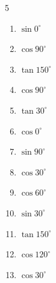 \begin{multicols}{5}
\begin{enumerate}
  \item $\displaystyle \sin{0^\circ}$

        \phantom{$\displaystyle =0$}

  \item $\displaystyle \cos{90^\circ}$

        \phantom{$\displaystyle =0$}

  \item $\displaystyle \tan{150^\circ}$


  \item $\displaystyle \cos{90^\circ}$

        \phantom{$\displaystyle =0$}

  \item $\displaystyle \tan{30^\circ}$


  \item $\displaystyle \cos{0^\circ}$

        \phantom{$\displaystyle =1$}

  \item $\displaystyle \sin{90^\circ}$

        \phantom{$\displaystyle =1$}

  \item $\displaystyle \cos{30^\circ}$


  \item $\displaystyle \cos{60^\circ}$


\columnbreak %

  \item $\displaystyle \sin{30^\circ}$


  \item $\displaystyle \tan{150^\circ}$


  \item $\displaystyle \cos{120^\circ}$


  \item $\displaystyle \cos{30^\circ}$


\end{enumerate}
\end{multicols}
